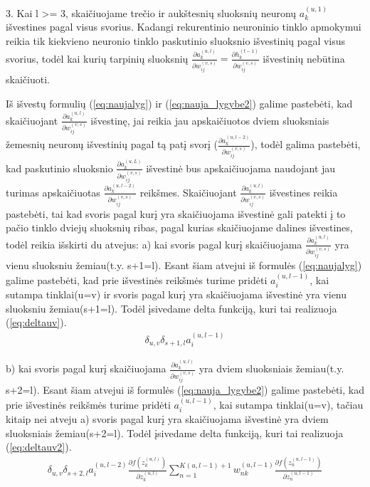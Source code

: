 3. Kai l >= 3, skaičiuojame trečio ir aukštesnių sluoksnių neuronų $a_k^{(u,1)}$ išvestines pagal visus svorius. Kadangi rekurentinio neuroninio tinklo apmokymui reikia tik kiekvieno neuronio tinklo paskutinio sluoksnio išvestinių pagal visus svorius, todėl kai kurių tarpinių sluoksnių $\frac{\partial a_k^{(u, l)}}{\partial w_{ij}^{(v,s)}} = \frac{\partial h_k^{(t-1)}}{\partial w_{ij}^{(v,s)}}$ išvestinių nebūtina skaičiuoti.

Iš išvestų formulių (\ref{eq:naujalyg}) ir (\ref{eq:nauja_lygybe2}) galime pastebėti, kad skaičiuojant $\frac{\partial a_k^{(u, l)}}{\partial w_{ij}^{(v,s)}}$ išvestinę, jai reikia jau apskaičiuotos dviem sluoksniais žemesnių neuronų išvestinių pagal tą patį svorį ($\frac{\partial a_k^{(u, l-2)}}{\partial w_{ij}^{(v,s)}}$), todėl galima pastebėti, kad paskutinio sluoksnio $\frac{\partial a_k^{(u, L)}}{\partial w_{ij}^{(v,s)}}$ išvestinė bus apskaičiuojama naudojant jau turimas apskaičiuotas  $\frac{\partial a_k^{(u, l-2)}}{\partial w_{ij}^{(v,s)}}$ reikšmes. Skaičiuojant $\frac{\partial a_k^{(u, l)}}{\partial w_{ij}^{(v,s)}}$ išvestines reikia pastebėti, tai kad svoris pagal kurį yra skaičiuojama išvestinė gali patekti į to pačio tinklo dviejų sluoksnių ribas, pagal kurias skaičiuojame dalines išvestines, todėl reikia išskirti du atvejus:
  a) kai svoris pagal kurį skaičiuojama $\frac{\partial a_k^{(u, l)}}{\partial w_{ij}^{(v,s)}}$ yra vienu sluoksniu žemiau(t.y. s+1=l).
    Esant šiam atvejui iš formulės (\ref{eq:naujalyg}) galime pastebėti, kad prie išvestinės reikšmės turime pridėti $a_i^{(u,l-1)}$, kai sutampa tinklai(u=v) ir svoris pagal kurį yra skaičiuojama išvestinė yra vienu sluoksniu žemiau(s+1=l). Todėl įsivedame delta funkciją, kuri tai realizuoja (\ref{eq:deltauv}).
    \begin{equation}\label{eq:deltauv}
      \begin{aligned}
        \delta_{u,v}\delta_{s+1,l}a_i^{(u,l-1)}
      \end{aligned}
    \end{equation}

  b) kai svoris pagal kurį skaičiuojama $\frac{\partial a_k^{(u, l)}}{\partial w_{ij}^{(v,s)}}$ yra dviem sluoksniais žemiau(t.y. s+2=l).
  Esant šiam atvejui iš formulės (\ref{eq:nauja_lygybe2}) galime pastebėti, kad prie išvestinės reikšmės turime pridėti $a_i^{(u,l-1)}$, kai sutampa tinklai(u=v), tačiau kitaip nei atveju a) svoris pagal kurį yra skaičiuojama išvestinė yra dviem sluoksniais žemiau(s+2=l). Todėl įsivedame delta funkciją, kuri tai realizuoja (\ref{eq:deltauv2}).
  \begin{equation}\label{eq:deltauv2}
    \begin{aligned}
      \delta_{u,v}\delta_{s+2,l}a_i^{(u,l-2)}\frac{\partial f(z_k^{(u,l)})}{\partial z_k^{(u,l)}} \sum_{n=1}^{K(u,l-1)+1} w_{nk}^{(u,l-1)} \frac{\partial f(z_n^{(u,l-1)})}{\partial z_n^{(u,l-1)}}
    \end{aligned}
  \end{equation}

